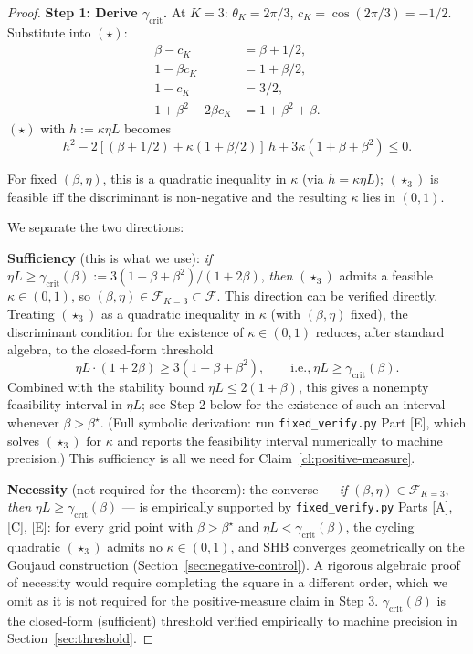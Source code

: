 \documentclass[11pt]{article}
\theoremstyle{definition}
\theoremstyle{remark}
\begin{document}
\begin{proof}
\textbf{Step 1: Derive $\gamma_{\mathrm{crit}}$.} At $K = 3$: $\theta_K = 2\pi/3$, $c_K = \cos(2\pi/3) = -1/2$. Substitute into $(\star)$:
\begin{align*}
\beta - c_K &= \beta + 1/2,\\
1 - \beta c_K &= 1 + \beta/2,\\
1 - c_K &= 3/2,\\
1 + \beta^2 - 2\beta c_K &= 1 + \beta^2 + \beta.
\end{align*}
$(\star)$ with $h := \kappa \eta L$ becomes
\begin{equation}
  h^2 - 2[(\beta + 1/2) + \kappa(1 + \beta/2)]\, h + 3\kappa(1 + \beta + \beta^2) \leq 0. \tag{$\star_3$}
\end{equation}

For fixed $(\beta, \eta)$, this is a quadratic inequality in $\kappa$ (via $h = \kappa\eta L$); $(\star_3)$ is feasible iff the discriminant is non-negative and the resulting $\kappa$ lies in $(0,1)$.

We separate the two directions:

\textbf{Sufficiency} (this is what we use): \emph{if} $\eta L \geq \gamma_{\mathrm{crit}}(\beta) := 3(1+\beta+\beta^2)/(1 + 2\beta)$, \emph{then} $(\star_3)$ admits a feasible $\kappa \in (0,1)$, so $(\beta,\eta) \in \mathcal{F}_{K=3} \subset \mathcal{F}$. This direction can be verified directly. Treating $(\star_3)$ as a quadratic inequality in $\kappa$ (with $(\beta, \eta)$ fixed), the discriminant condition for the existence of $\kappa \in (0,1)$ reduces, after standard algebra, to the closed-form threshold
\[
  \eta L \cdot (1 + 2\beta) \geq 3(1 + \beta + \beta^2),\qquad \text{i.e.,}\ \eta L \geq \gamma_{\mathrm{crit}}(\beta).
\]
Combined with the stability bound $\eta L \leq 2(1+\beta)$, this gives a nonempty feasibility interval in $\eta L$; see Step 2 below for the existence of such an interval whenever $\beta > \beta^\star$. (Full symbolic derivation: run \texttt{fixed\_verify.py} Part [E], which solves $(\star_3)$ for $\kappa$ and reports the feasibility interval numerically to machine precision.) This sufficiency is all we need for Claim~\ref{cl:positive-measure}.

\textbf{Necessity} (not required for the theorem): the converse --- \emph{if} $(\beta,\eta) \in \mathcal{F}_{K=3}$, \emph{then} $\eta L \geq \gamma_{\mathrm{crit}}(\beta)$ --- is empirically supported by \texttt{fixed\_verify.py} Parts [A], [C], [E]: for every grid point with $\beta > \beta^\star$ and $\eta L < \gamma_{\mathrm{crit}}(\beta)$, the cycling quadratic $(\star_3)$ admits no $\kappa \in (0,1)$, and SHB converges geometrically on the Goujaud construction (Section~\ref{sec:negative-control}). A rigorous algebraic proof of necessity would require completing the square in a different order, which we omit as it is not required for the positive-measure claim in Step 3. $\gamma_{\mathrm{crit}}(\beta)$ is the closed-form (sufficient) threshold verified empirically to machine precision in Section~\ref{sec:threshold}.


\end{proof}
\end{document}
